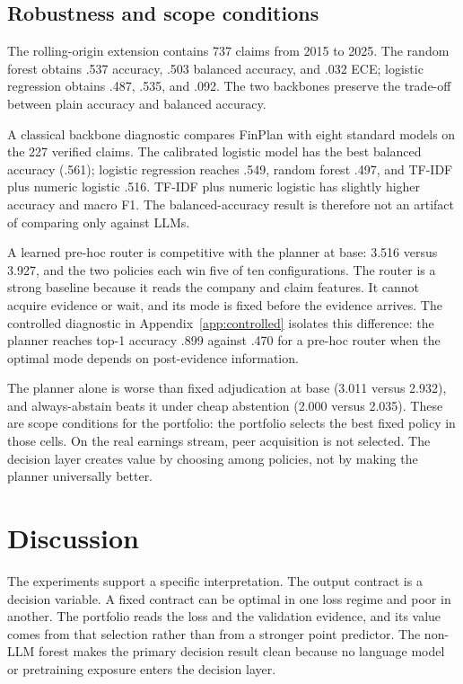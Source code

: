 \documentclass[11pt]{article}
\newcommand{\method}{FinPlan}
\begin{document}
\subsection{Robustness and scope conditions}
The rolling-origin extension contains 737 claims from 2015 to 2025. The random forest obtains .537 accuracy, .503 balanced accuracy, and .032 ECE; logistic regression obtains .487, .535, and .092. The two backbones preserve the trade-off between plain accuracy and balanced accuracy.

A classical backbone diagnostic compares \method{} with eight standard models on the 227 verified claims. The calibrated logistic model has the best balanced accuracy (.561); logistic regression reaches .549, random forest .497, and TF-IDF plus numeric logistic .516. TF-IDF plus numeric logistic has slightly higher accuracy and macro F1. The balanced-accuracy result is therefore not an artifact of comparing only against LLMs.

A learned pre-hoc router is competitive with the planner at base: 3.516 versus 3.927, and the two policies each win five of ten configurations. The router is a strong baseline because it reads the company and claim features. It cannot acquire evidence or wait, and its mode is fixed before the evidence arrives. The controlled diagnostic in Appendix~\ref{app:controlled} isolates this difference: the planner reaches top-1 accuracy .899 against .470 for a pre-hoc router when the optimal mode depends on post-evidence information.

The planner alone is worse than fixed adjudication at base (3.011 versus 2.932), and always-abstain beats it under cheap abstention (2.000 versus 2.035). These are scope conditions for the portfolio: the portfolio selects the best fixed policy in those cells. On the real earnings stream, peer acquisition is not selected. The decision layer creates value by choosing among policies, not by making the planner universally better.

\section{Discussion}
The experiments support a specific interpretation. The output contract is a decision variable. A fixed contract can be optimal in one loss regime and poor in another. The portfolio reads the loss and the validation evidence, and its value comes from that selection rather than from a stronger point predictor. The non-LLM forest makes the primary decision result clean because no language model or pretraining exposure enters the decision layer.
\end{document}
